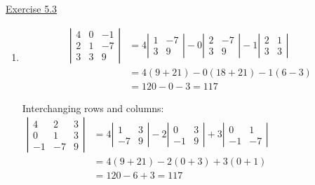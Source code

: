 
\underline{Exercise 5.3}

\begin{enumerate}
\item 
\[
\begin{aligned}
\left|\begin{array}{ccc}
4 & 0 & -1 \\
2 & 1 & -7 \\
3 & 3 & 9
\end{array}\right| &=4\left|\begin{array}{rr}
1 & -7 \\
3 & 9
\end{array}\right|-0\left|\begin{array}{cc}
2 & -7 \\
3 & 9
\end{array}\right|-1\left|\begin{array}{ll}
2 & 1 \\
3 & 3
\end{array}\right| \\
&=4(9+21)-0(18+21)-1(6-3) \\
&=120-0-3=117
\end{aligned}
\]

Interchanging rows and columns:\\

\( \begin{aligned}\left|\begin{array}{ccc}4 & 2 & 3 \\ 0 & 1 & 3 \\ -1 & -7 & 9\end{array}\right| &=4\left|\begin{array}{cc}1 & 3 \\ -7 & 9\end{array}\right|-2\left|\begin{array}{cc}0 & 3 \\ -1 & 9\end{array}\right|+3\left|\begin{array}{cc}0 & 1 \\ -1 & -7\end{array}\right| \\ &=4(9+21)-2(0+3)+3(0+1) \\ &=120-6+3=117 \end{aligned} \) \\


\end{enumerate}
